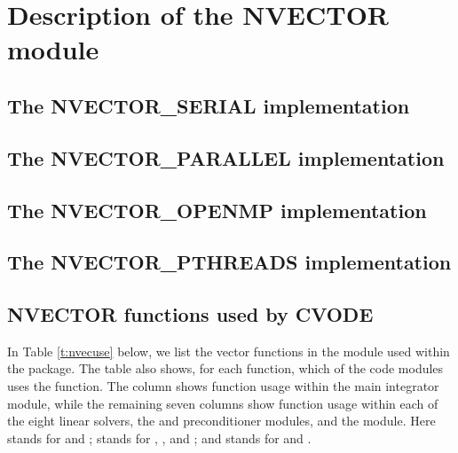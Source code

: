 \chapter{Description of the NVECTOR module}\label{s:nvector}


\section{The NVECTOR\_SERIAL implementation}\label{ss:nvec_ser}


\section{The NVECTOR\_PARALLEL implementation}\label{ss:nvec_par}


\section{The NVECTOR\_OPENMP implementation}\label{ss:nvec_openmp}


\section{The NVECTOR\_PTHREADS implementation}\label{ss:nvec_pthreads}


\section{NVECTOR functions used by CVODE}

In Table \ref{t:nvecuse} below, we list the vector functions in the 
{\nvector} module used within the {\cvode} package.
The table also shows, for each function, which of the code modules uses
the function. The {\cvode} column shows function usage within the main
integrator module, while the remaining seven columns show function usage
within each of the eight {\cvode} linear solvers, the {\cvbandpre} and
{\cvbbdpre} preconditioner modules, and the {\fcvode} module.  Here
{\cvdls} stands for {\cvdense} and {\cvband}; {\cvspils} stands for
{\cvspgmr}, {\cvspbcg}, and {\cvsptfqmr}; and {\cvsls} stands for
{\cvklu} and {\cvsuperlumt}.

